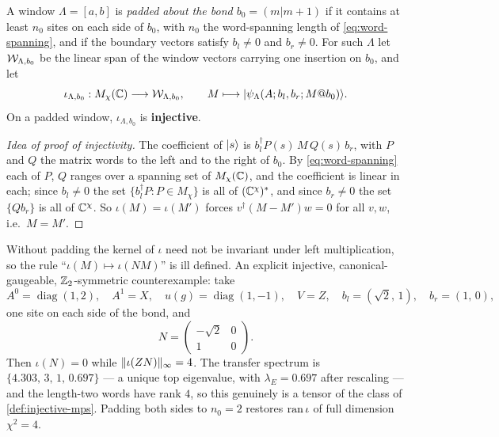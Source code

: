 \begin{definition}
\label{def:padded-window}
A window $\Lambda = [a,b]$ is \emph{padded about the bond $b_{0} = (m|m+1)$}
if it contains at least $n_{0}$ sites on each side of $b_{0}$, with $n_{0}$ the
word-spanning length of \eqref{eq:word-spanning}, and if the boundary vectors
satisfy $b_{l} \neq 0$ and $b_{r} \neq 0$. For such $\Lambda$ let
$\mathcal{W}_{\Lambda, b_{0}}$ be the linear span of the window vectors carrying one
insertion on $b_{0}$, and let
\begin{equation}
  \iota_{\Lambda, b_{0}} : M_{\chi}(\mathbb{C}) \longrightarrow
  \mathcal{W}_{\Lambda, b_{0}},
  \qquad
  M \longmapsto |\psi_{\Lambda}(A; b_{l}, b_{r}; M@b_{0})\rangle .
\end{equation}
On a padded window, $\iota_{\Lambda,b_{0}}$ is \textbf{injective}.
\end{definition}

\begin{proof}[Idea of proof of injectivity]
The coefficient of $|s\rangle$ is $b_{l}^{\dagger} P(s) \, M \, Q(s) \, b_{r}$,
with $P$ and $Q$ the matrix words to the left and to the right of $b_{0}$. By
\eqref{eq:word-spanning} each of $P$, $Q$ ranges over a spanning set of
$M_{\chi}(\mathbb{C})$, and the coefficient is linear in each; since $b_{l} \neq 0$
the set $\{ b_{l}^{\dagger} P : P \in M_{\chi} \}$ is all of
$(\mathbb{C}^{\chi})^{*}$, and since $b_{r} \neq 0$ the set $\{ Q b_{r} \}$ is all of
$\mathbb{C}^{\chi}$. So $\iota(M) = \iota(M')$ forces $v^{\dagger}(M-M')w = 0$ for all
$v, w$, i.e.\ $M = M'$.
\end{proof}

\begin{remark}
\label{rem:padding-necessary}
Without padding the kernel of $\iota$ need not be invariant under left
multiplication, so the rule ``$\iota(M) \mapsto \iota(NM)$'' is ill defined.
An explicit injective, canonical-gaugeable, $\mathbb{Z}_{2}$-symmetric counterexample:
take
\begin{equation}
  A^{0} = \operatorname{diag}(1,2), \quad A^{1} = X, \quad
  u(g) = \operatorname{diag}(1,-1), \quad V = Z, \quad
  b_{l} = (\sqrt{2},\, 1), \quad b_{r} = (1,\, 0),
\end{equation}
one site on each side of the bond, and
\begin{equation}
  N = \begin{pmatrix} -\sqrt{2} & 0 \\ 1 & 0 \end{pmatrix} .
\end{equation}
Then $\iota(N) = 0$ while $\lVert \iota(ZN)\rVert_{\infty} = 4$. The transfer
spectrum is $\{4.303,\, 3,\, 1,\, 0.697\}$ --- a unique top eigenvalue, with
$\lambda_{E} = 0.697$ after rescaling --- and the length-two words have rank
$4$, so this genuinely is a tensor of the class of
\cref{def:injective-mps}. Padding both sides to $n_{0} = 2$ restores
$\operatorname{ran} \iota$ of full dimension $\chi^{2} = 4$.
\end{remark}

